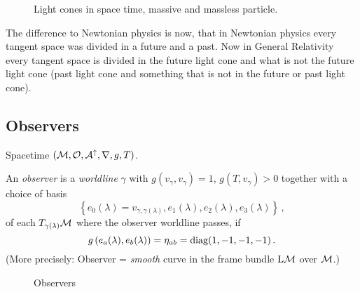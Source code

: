 \begin{figure}[tbh]
    \centering\def\svgwidth{\columnwidth}
    
    \caption{Light cones in space time, massive and massless particle.}
    \label{fig:spacetimeLightCones}
\end{figure}
\begin{note}
    The difference to Newtonian physics is now, that in Newtonian physics every tangent space was
    divided in a future and a past. 
    Now in General Relativity every tangent space is divided in the future light cone
    and what is not the future light cone (past light cone and something that is not in the
    future or past light cone).
\end{note}

\subsection{Observers}
Spacetime $(\mathcal{M}, \mathcal{O}, \mathcal{A}^\uparrow, \nabla, g, T)$.
\begin{defn}[Observer]
    An \textit{observer} is a \textit{worldline} $\gamma$ with
    $g(v_\gamma, v_\gamma) = 1$, $g(T, v_\gamma)>0$
    together with a choice of basis
    \begin{equation}
        \left\{ e_0(\lambda) = v_{\gamma,\gamma(\lambda)}, e_1(\lambda), e_2(\lambda), e_3(\lambda) \right\}\,,
    \end{equation}
    of each $T_{\gamma(\lambda)}\mathcal{M}$ where the observer worldline passes,
    if
    \begin{equation}
        g\left( e_a(\lambda), e_b(\lambda) \right) = \eta_{ab} = \operatorname{diag}(1, -1, -1, -1)\,.
    \end{equation}
    (More precisely: Observer = \textit{smooth} curve in the frame bundle
    $\mathrm{L}\mathcal{M}$ over $\mathcal{M}$.)
\end{defn}

\begin{figure}[tbh]
    \centering\def\svgwidth{\columnwidth}
    
    \caption{Observers}
    \label{fig:observers}
\end{figure}

